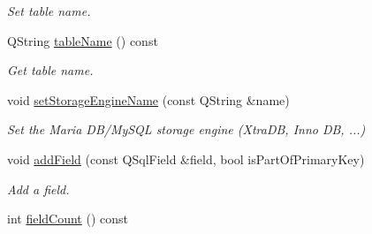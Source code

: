 \begin{DoxyCompactItemize}
\begin{DoxyCompactList}\small\item\em Set table name. \end{DoxyCompactList}\item 
\hypertarget{classmdt_sql_schema_table_a24def48594abf674f96852a4c0d5e9c1}{
QString \hyperlink{classmdt_sql_schema_table_a24def48594abf674f96852a4c0d5e9c1}{tableName} () const }
\label{classmdt_sql_schema_table_a24def48594abf674f96852a4c0d5e9c1}

\begin{DoxyCompactList}\small\item\em Get table name. \end{DoxyCompactList}\item 
\hypertarget{classmdt_sql_schema_table_a175f4d150a816bd46bd1a8b3fccbe059}{
void \hyperlink{classmdt_sql_schema_table_a175f4d150a816bd46bd1a8b3fccbe059}{setStorageEngineName} (const QString \&name)}
\label{classmdt_sql_schema_table_a175f4d150a816bd46bd1a8b3fccbe059}

\begin{DoxyCompactList}\small\item\em Set the Maria DB/MySQL storage engine (XtraDB, Inno DB, ...) \end{DoxyCompactList}\item 
\hypertarget{classmdt_sql_schema_table_a199589fde3f06590ba9cd38b1885fa38}{
void \hyperlink{classmdt_sql_schema_table_a199589fde3f06590ba9cd38b1885fa38}{addField} (const QSqlField \&field, bool isPartOfPrimaryKey)}
\label{classmdt_sql_schema_table_a199589fde3f06590ba9cd38b1885fa38}

\begin{DoxyCompactList}\small\item\em Add a field. \end{DoxyCompactList}\item 
\hypertarget{classmdt_sql_schema_table_a24a9e8f260bc96f96219711981124d87}{
int \hyperlink{classmdt_sql_schema_table_a24a9e8f260bc96f96219711981124d87}{fieldCount} () const }
\label{classmdt_sql_schema_table_a24a9e8f260bc96f96219711981124d87}


\end{DoxyCompactItemize}
